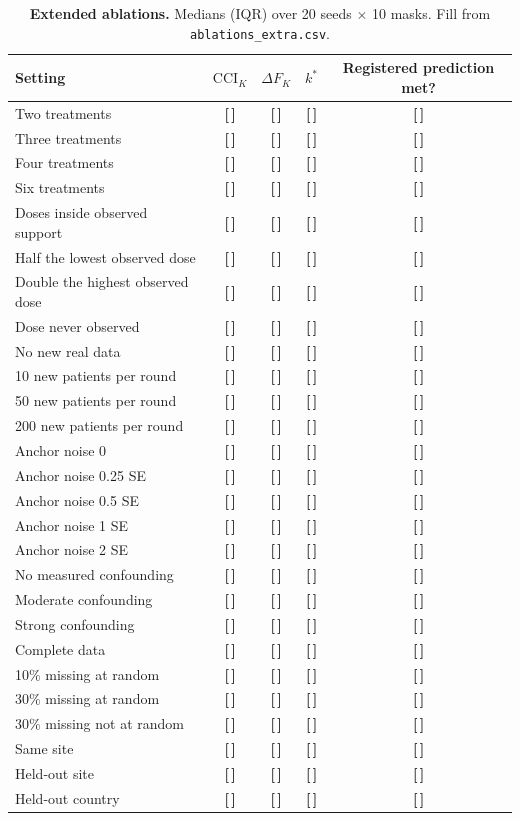 \documentclass[11pt,a4paper]{article}
\newcommand{\T}{{\color{red}\textbf{[\,]}}}
\newcommand{\CCI}{\mathrm{CCI}}
\begin{document}
\begin{table}[!htbp]\centering\scriptsize
\caption{\textbf{Extended ablations.} Medians (IQR) over 20 seeds $\times$ 10 masks. Fill from \texttt{ablations\_extra.csv}.}
\label{tab:s40}
\begin{tabularx}{\textwidth}{@{}p{3.9cm} C C C C@{}}\toprule
Setting & $\CCI_K$ & $\Delta F_K$ & $k^*$ & Registered prediction met?\\\midrule
Two treatments & \T & \T & \T & \T\\
Three treatments & \T & \T & \T & \T\\
Four treatments & \T & \T & \T & \T\\
Six treatments & \T & \T & \T & \T\\
\midrule
Doses inside observed support & \T & \T & \T & \T\\
Half the lowest observed dose & \T & \T & \T & \T\\
Double the highest observed dose & \T & \T & \T & \T\\
Dose never observed & \T & \T & \T & \T\\
\midrule
No new real data & \T & \T & \T & \T\\
10 new patients per round & \T & \T & \T & \T\\
50 new patients per round & \T & \T & \T & \T\\
200 new patients per round & \T & \T & \T & \T\\
\midrule
Anchor noise 0 & \T & \T & \T & \T\\
Anchor noise 0.25 SE & \T & \T & \T & \T\\
Anchor noise 0.5 SE & \T & \T & \T & \T\\
Anchor noise 1 SE & \T & \T & \T & \T\\
Anchor noise 2 SE & \T & \T & \T & \T\\
\midrule
No measured confounding & \T & \T & \T & \T\\
Moderate confounding & \T & \T & \T & \T\\
Strong confounding & \T & \T & \T & \T\\
\midrule
Complete data & \T & \T & \T & \T\\
10\% missing at random & \T & \T & \T & \T\\
30\% missing at random & \T & \T & \T & \T\\
30\% missing not at random & \T & \T & \T & \T\\
\midrule
Same site & \T & \T & \T & \T\\
Held-out site & \T & \T & \T & \T\\
Held-out country & \T & \T & \T & \T\\
\bottomrule\end{tabularx}
\end{table}
\end{document}
